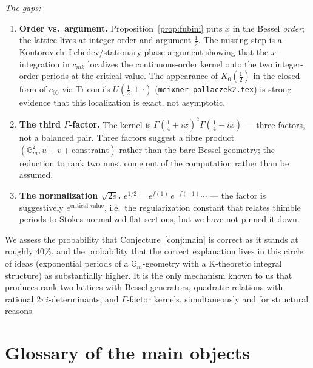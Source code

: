 \documentclass[11pt]{article}
\theoremstyle{definition}
\theoremstyle{remark}
\newcommand{\Gm}{\mathbb{G}_m}
\newcommand{\G}{\Gamma}
\begin{document}
\emph{The gaps:}
\begin{enumerate}
\item \textbf{Order vs.\ argument.} Proposition~\ref{prop:fubini}
puts $x$ in the Bessel \emph{order}; the lattice lives at integer
order and argument $\tfrac12$. The missing step is a
Kontorovich--Lebedev/stationary-phase argument showing that the
$x$-integration in $c_{mk}$ localizes the continuous-order kernel
onto the two integer-order periods at the critical value. The
appearance of $K_0(\tfrac12)$ in the closed form of $c_{00}$ via
Tricomi's $U(\tfrac12,1,\cdot)$ (\texttt{meixner-pollaczek2.tex})
is strong evidence that this localization is exact, not
asymptotic.
\item \textbf{The third $\G$-factor.} The kernel is
$\G(\tfrac14+ix)^2\G(\tfrac14-ix)$ --- three factors, not a
balanced pair. Three factors suggest a fibre product
$(\Gm^2, u + v + \text{constraint})$ rather than the bare Bessel
geometry; the reduction to rank two must come out of the
computation rather than be assumed.
\item \textbf{The normalization $\sqrt{2e}$.} $e^{1/2} =
e^{f(1)}\,e^{-f(-1)}\cdots$ --- the factor is suggestively
$e^{\text{critical value}}$, i.e.\ the regularization constant
that relates thimble periods to Stokes-normalized flat sections,
but we have not pinned it down.
\end{enumerate}

We assess the probability that Conjecture~\ref{conj:main} is
correct as it stands at roughly $40\%$, and the probability that
the correct explanation lives in this circle of ideas (exponential
periods of a $\Gm$-geometry with a K-theoretic integral structure)
as substantially higher. It is the only mechanism known to us that
produces rank-two lattices with Bessel generators, quadratic
relations with rational $2\pi i$-determinants, and $\G$-factor
kernels, simultaneously and for structural reasons.

\section*{Glossary of the main objects}
\end{document}
